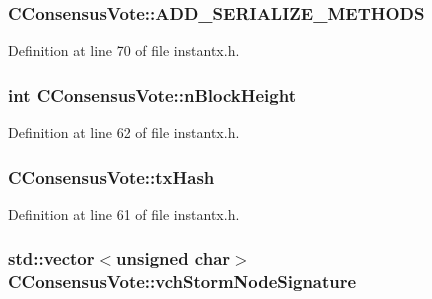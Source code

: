 \subsubsection[{A\+D\+D\+\_\+\+S\+E\+R\+I\+A\+L\+I\+Z\+E\+\_\+\+M\+E\+T\+H\+O\+D\+S}]{\setlength{\rightskip}{0pt plus 5cm}C\+Consensus\+Vote\+::\+A\+D\+D\+\_\+\+S\+E\+R\+I\+A\+L\+I\+Z\+E\+\_\+\+M\+E\+T\+H\+O\+D\+S}\label{class_c_consensus_vote_af0f1e45072c8cf14e8e00eb28a505835}


Definition at line 70 of file instantx.\+h.

\hypertarget{class_c_consensus_vote_a19f39b69e4adf3f9b5557d465cabc7ed}{}
\subsubsection[{n\+Block\+Height}]{\setlength{\rightskip}{0pt plus 5cm}int C\+Consensus\+Vote\+::n\+Block\+Height}\label{class_c_consensus_vote_a19f39b69e4adf3f9b5557d465cabc7ed}


Definition at line 62 of file instantx.\+h.

\hypertarget{class_c_consensus_vote_a3eca3f8fac54643f7f2ac863635491d6}{}
\subsubsection[{tx\+Hash}]{ C\+Consensus\+Vote\+::tx\+Hash}\label{class_c_consensus_vote_a3eca3f8fac54643f7f2ac863635491d6}


Definition at line 61 of file instantx.\+h.

\hypertarget{class_c_consensus_vote_aaef3986bf440b3222751f5e7483d7ae1}{}
\subsubsection[{vch\+Storm\+Node\+Signature}]{\setlength{\rightskip}{0pt plus 5cm}std\+::vector$<$unsigned char$>$ C\+Consensus\+Vote\+::vch\+Storm\+Node\+Signature}\label{class_c_consensus_vote_aaef3986bf440b3222751f5e7483d7ae1}


